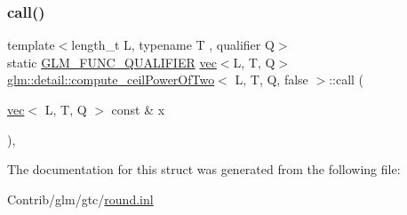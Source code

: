 \subsubsection{\texorpdfstring{call()}{call()}}
{\footnotesize\ttfamily template$<$length\+\_\+t L, typename T , qualifier Q$>$ \\
static \mbox{\hyperlink{setup_8hpp_a33fdea6f91c5f834105f7415e2a64407}{G\+L\+M\+\_\+\+F\+U\+N\+C\+\_\+\+Q\+U\+A\+L\+I\+F\+I\+ER}} \mbox{\hyperlink{structglm_1_1vec}{vec}}$<$L, T, Q$>$ \mbox{\hyperlink{structglm_1_1detail_1_1compute__ceil_power_of_two}{glm\+::detail\+::compute\+\_\+ceil\+Power\+Of\+Two}}$<$ L, T, Q, false $>$\+::call (\begin{DoxyParamCaption}\item[{\mbox{\hyperlink{structglm_1_1vec}{vec}}$<$ L, T, Q $>$ const \&}]{x }\end{DoxyParamCaption})\hspace{0.3cm}{\ttfamily [inline]}, {\ttfamily [static]}}



The documentation for this struct was generated from the following file\+:\begin{DoxyCompactItemize}
\item 
Contrib/glm/gtc/\mbox{\hyperlink{round_8inl}{round.\+inl}}\end{DoxyCompactItemize}
